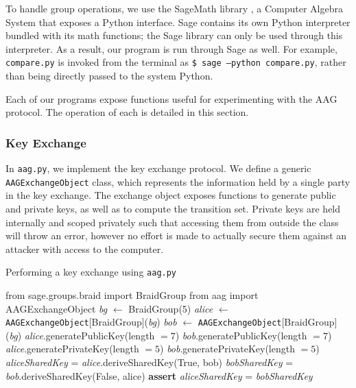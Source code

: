 To handle group operations, we use the SageMath library \cite{sagemath}, a Computer Algebra System that exposes a Python interface. Sage contains its own  Python interpreter bundled with its math functions; the Sage library can only be used through this interpreter. As a result, our program is run through Sage as well. For example, \texttt{compare.py} is invoked from the terminal as \texttt{\$ sage --python compare.py}, rather than being directly passed to the system Python.

Each of our programs expose functions useful for experimenting with the AAG protocol. The operation of each is detailed in this section.

\subsubsection{Key Exchange}\label{sec:impl-key-exchange} In \texttt{aag.py}, we implement the key exchange protocol. We define a generic \texttt{AAGExchangeObject} class, which represents the information held by a single party in the key exchange. The exchange object exposes functions to generate public and private keys, as well as to compute the transition set. Private keys are held internally and scoped privately such that accessing them from outside the class will throw an error, however no effort is made to actually secure them against an attacker with access to the computer.

\begin{algorithm}
\caption{Performing a key exchange using \texttt{aag.py}}	
\label{alg:key-exchange}
\DontPrintSemicolon
{}
from sage.groups.braid import BraidGroup\;
from aag import AAGExchangeObject\;\;
\textit{bg} $\gets$ BraidGroup(5) 
\textit{alice} $\gets$ \texttt{AAGExchangeObject}[BraidGroup](\textit{bg})\;
\textit{bob} $\gets$ \texttt{AAGExchangeObject}[BraidGroup](\textit{bg})\;\;
\textit{alice}.generatePublicKey(length $= 7$)\;
\textit{bob}.generatePublicKey(length $= 7$)\;
\textit{alice}.generatePrivateKey(length $= 5$)\;
\textit{bob}.generatePrivateKey(length $= 5$)\;\;
\textit{aliceSharedKey} = \textit{alice}.deriveSharedKey(True, bob)\;
\textit{bobSharedKey} = \textit{bob}.deriveSharedKey(False, alice)\;\;
\textbf{assert} \textit{aliceSharedKey} = \textit{bobSharedKey}
\end{algorithm}

